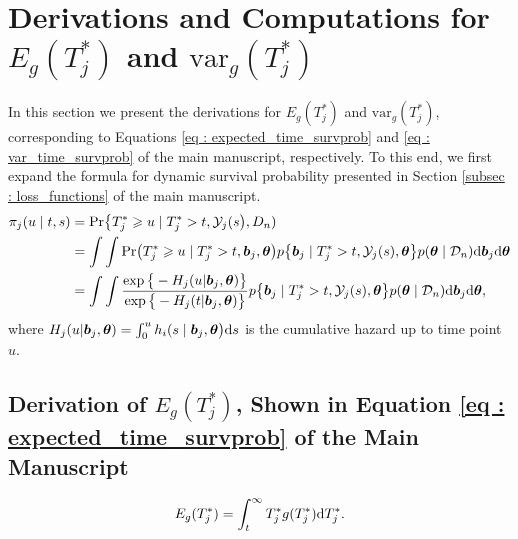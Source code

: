 \section{Derivations and Computations for $E_g(T^*_j)$ and $\mbox{var}_g(T^*_j)$}
In this section we present the derivations for $E_g(T^*_j)$ and $\mbox{var}_g(T^*_j)$, corresponding to Equations \ref{eq : expected_time_survprob} and \ref{eq : var_time_survprob} of the main manuscript, respectively. To this end, we first expand the formula for dynamic survival probability presented in Section \ref{subsec : loss_functions} of the main manuscript.
\begin{equation}
\label{eq : dyn_surv_prob_expanded}
\begin{split}
\pi_j(u \mid t, s) &= \mbox{Pr}\big\{T^*_j \geq u \mid  T^*_j >t, \mathcal{Y}_j(s\big), D_n)\\
&= \int \int \mbox{Pr}\big(T^*_j \geq u \mid  T^*_j >t, \bmath{b}_j,\bmath{\theta}\big) p\big\{\bmath{b}_j \mid T^*_j>t, \mathcal{Y}_j(s), \bmath{\theta}\big\} p(\bmath{\theta} \mid \mathcal{D}_n) \rmn{d} \bmath{b}_j \rmn{d} \bmath{\theta}\\
&= \int \int \frac{\exp\big\{-H_j(u | \bmath{b}_j, \bmath{\theta})\big\}}{\exp\big\{-H_j(t | \bmath{b}_j, \bmath{\theta})\big\}} p\big\{\bmath{b}_j \mid T^*_j>t, \mathcal{Y}_j(s), \bmath{\theta}\big\} p(\bmath{\theta} \mid \mathcal{D}_n) \rmn{d} \bmath{b}_j \rmn{d} \bmath{\theta},
\end{split}
\end{equation}
where $H_j(u | \boldsymbol{b}_j, \boldsymbol{\theta}) = \int_0^u h_i(s \mid \boldsymbol{b}_j, \boldsymbol{\theta}\big)\mathrm{d} s$ is the cumulative hazard up to time point $u$.

\subsection{Derivation of $E_g(T^*_j)$, Shown in Equation \ref{eq : expected_time_survprob} of the Main Manuscript}
\begin{equation*}
E_g(T^*_j) = \int_t^{\infty} T^*_j g(T^*_j)\mathrm{d} T^*_j.
\end{equation*}

